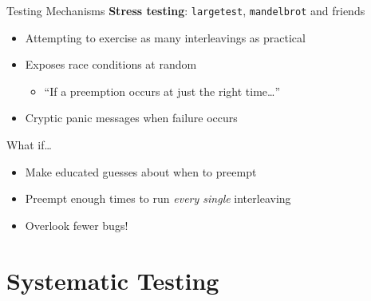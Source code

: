 \documentclass[xcolor=dvipsnames]{beamer}
\begin{document}
\begin{frame}{Testing Mechanisms}
	\textbf{Stress testing}: \texttt{largetest}, \texttt{mandelbrot} and friends
	\begin{itemize}
		\item Attempting to exercise as many interleavings as practical
		\item Exposes race conditions at random
		\begin{itemize}
			\item ``If a preemption occurs at just the right time\ldots''
		\end{itemize}
		\item Cryptic panic messages when failure occurs
	\end{itemize}
	\linegap
	What if\ldots
	\begin{itemize}
		\item Make educated guesses about when to preempt
		\item Preempt enough times to run {\em every single} interleaving
		\item Overlook fewer bugs!
	\end{itemize}
\end{frame}


\section{Systematic Testing}

\end{document}
